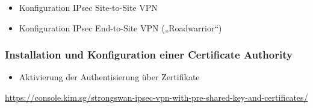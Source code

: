 \begin{itemize}
	\item Konfiguration IPsec Site-to-Site VPN  
	\item Konfiguration  IPsec End-to-Site VPN („Roadwarrior“)
\end{itemize}
\subsubsection{Installation und Konfiguration einer Certificate Authority}
\begin{itemize}
	\item Aktivierung der Authentisierung über Zertifikate 
\end{itemize}

\href{https://console.kim.sg/strongswan-ipsec-vpn-with-pre-shared-key-and-certificates/}{https://console.kim.sg/strongswan-ipsec-vpn-with-pre-shared-key-and-certificates/}

\clearpage